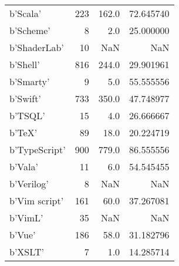 \begin{table}
\begin{tabular}{|l|r|r|r|}
b'Scala'            &                   223 &     162.0 &      72.645740 \\
b'Scheme'           &                     8 &       2.0 &      25.000000 \\
b'ShaderLab'        &                    10 &       NaN &            NaN \\
b'Shell'            &                   816 &     244.0 &      29.901961 \\
b'Smarty'           &                     9 &       5.0 &      55.555556 \\
b'Swift'            &                   733 &     350.0 &      47.748977 \\
b'TSQL'             &                    15 &       4.0 &      26.666667 \\
b'TeX'              &                    89 &      18.0 &      20.224719 \\
b'TypeScript'       &                   900 &     779.0 &      86.555556 \\
b'Vala'             &                    11 &       6.0 &      54.545455 \\
b'Verilog'          &                     8 &       NaN &            NaN \\
b'Vim script'       &                   161 &      60.0 &      37.267081 \\
b'VimL'             &                    35 &       NaN &            NaN \\
b'Vue'              &                   186 &      58.0 &      31.182796 \\
b'XSLT'             &                     7 &       1.0 &      14.285714 \\

\end{tabular}
\end{table}

